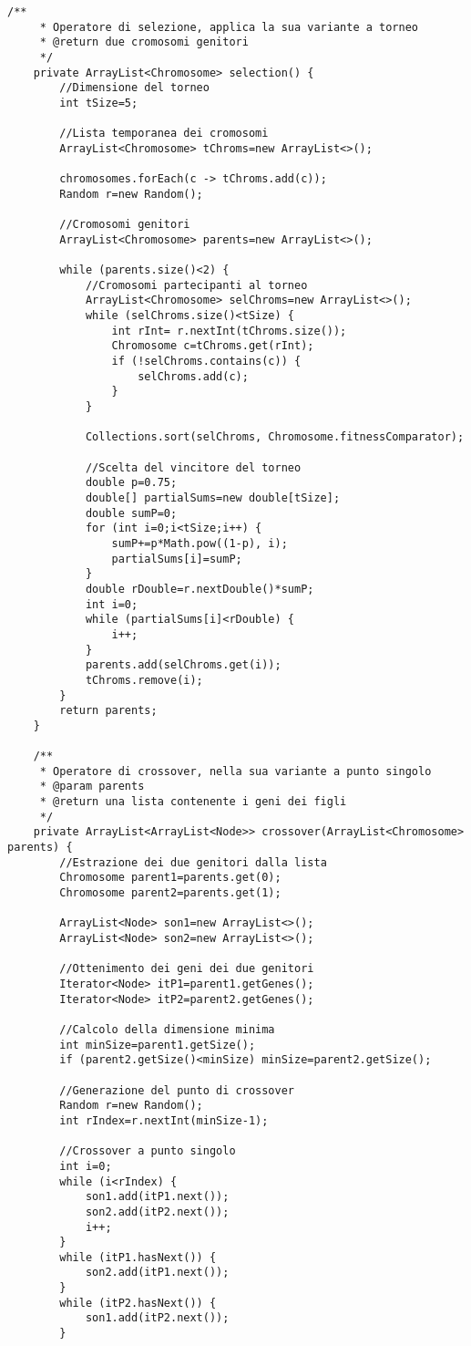 \begin{lstlisting}[style=Java]
	/**
	 * Operatore di selezione, applica la sua variante a torneo
	 * @return due cromosomi genitori
	 */
	private ArrayList<Chromosome> selection() {
		//Dimensione del torneo
		int tSize=5;
		
		//Lista temporanea dei cromosomi
		ArrayList<Chromosome> tChroms=new ArrayList<>();
		
		chromosomes.forEach(c -> tChroms.add(c));
		Random r=new Random();
		
		//Cromosomi genitori
		ArrayList<Chromosome> parents=new ArrayList<>();
		
		while (parents.size()<2) {
			//Cromosomi partecipanti al torneo
			ArrayList<Chromosome> selChroms=new ArrayList<>();
			while (selChroms.size()<tSize) {
				int rInt= r.nextInt(tChroms.size());
				Chromosome c=tChroms.get(rInt);
				if (!selChroms.contains(c)) {
					selChroms.add(c);
				}
			}
			
			Collections.sort(selChroms, Chromosome.fitnessComparator);
			
			//Scelta del vincitore del torneo
			double p=0.75;
			double[] partialSums=new double[tSize];
			double sumP=0;
			for (int i=0;i<tSize;i++) {
				sumP+=p*Math.pow((1-p), i);
				partialSums[i]=sumP;
			}
			double rDouble=r.nextDouble()*sumP;
			int i=0;
			while (partialSums[i]<rDouble) {
				i++;
			}
			parents.add(selChroms.get(i));
			tChroms.remove(i);
		}
		return parents;
	}
	
	/**
	 * Operatore di crossover, nella sua variante a punto singolo
	 * @param parents
	 * @return una lista contenente i geni dei figli
	 */
	private ArrayList<ArrayList<Node>> crossover(ArrayList<Chromosome> parents) {
		//Estrazione dei due genitori dalla lista
		Chromosome parent1=parents.get(0);
		Chromosome parent2=parents.get(1);
		
		ArrayList<Node> son1=new ArrayList<>();
		ArrayList<Node> son2=new ArrayList<>();
		
		//Ottenimento dei geni dei due genitori
		Iterator<Node> itP1=parent1.getGenes();
		Iterator<Node> itP2=parent2.getGenes();
		
		//Calcolo della dimensione minima
		int minSize=parent1.getSize();
		if (parent2.getSize()<minSize) minSize=parent2.getSize();
		
		//Generazione del punto di crossover
		Random r=new Random();
		int rIndex=r.nextInt(minSize-1);
		
		//Crossover a punto singolo
		int i=0;
		while (i<rIndex) {
			son1.add(itP1.next());
			son2.add(itP2.next());
			i++;
		}
		while (itP1.hasNext()) {
			son2.add(itP1.next());
		}
		while (itP2.hasNext()) {
			son1.add(itP2.next());
		}
		

\end{lstlisting}
